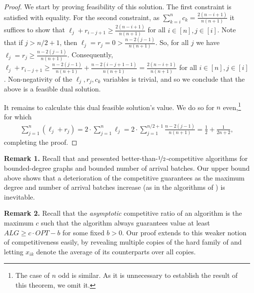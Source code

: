 \begin{proof}
We start by proving feasibility of this solution. 
The first constraint is satisfied with equality. For the second constraint, as $\sum_{k=i}^n  c_k = \frac{2 (n-i+1)}{n(n+1)}$ it suffices to show that 
$\ell_j + r_{i-j+1} \geq \frac{2 (n-i+1)}{n(n+1)}$ for all $i\in [n], j \in [i]$.
Note that if $j > n/2 +1$, then $\ell_j = r_j = 0 > \frac{n-2(j-1)}{n(n+1)}$. So, for all $j$ we have $\ell_j = r_j \geq \frac{n-2(j-1)}{n(n+1)}$.
Consequently, $\ell_j + r_{i-j+1} \geq \frac{n-2(j-1)}{n(n+1)} +\frac{n-2(i-j+1-1)}{n(n+1)} =  \frac{2 (n - i + 1)}{n (n+1)}$ for all $i\in [n], j \in [i]$. Non-negativity of the $\ell_j,r_j,c_k$ variables is trivial, and so we conclude that the above is a feasible dual solution.

It remains to calculate this dual feasible solution's value. We do so for $n$ even,\footnote{The case of $n$ odd is similar. As it is unnecessary to establish the result of this theorem, we omit it.} for which
\begin{align*}
        \sum_{j=1}^n (\ell_j + r_j ) = 2\cdot \sum_{j=1}^n \ell_j = 
        2\cdot \sum_{j=1}^{n/2 +1} \frac{n - 2(j-1)}{n(n+1)}  = \frac{1}{2} + \frac{1}{2n +2},
\end{align*}
completing the proof.
\end{proof}


{\textbf{Remark 1.}}  Recall that \citet{buchbinder2018online} and \citet{lee2017maximum} presented better-than-$\nicefrac{1}{2}$-competitive algorithms for bounded-degree graphs and bounded number of arrival batches. Our upper bound above shows that a deterioration of the competitive guarantees as the maximum degree and number of arrival batches increase (as in the algorithms of \cite{buchbinder2018online,lee2017maximum}) is inevitable.

\textbf{Remark 2.} Recall that the \emph{asymptotic} competitive ratio of an algorithm is the maximum $c$ such that the algorithm always guarantees value at least $ALG\geq c\cdot OPT - b$ for some fixed $b>0$. 
Our proof extends to this weaker notion of competitiveness easily, by revealing multiple copies of the hard family of  and letting $x_{ik}$ denote the average of its 
counterparts over all copies.

